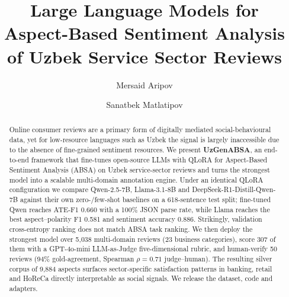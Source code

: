 \documentclass[runningheads]{llncs}
\begin{document}
\title{Large Language Models for Aspect-Based Sentiment Analysis of Uzbek Service Sector Reviews}


\author{Mersaid Aripov \and
Sanatbek Matlatipov}



\maketitle

\begin{abstract}
Online consumer reviews are a primary form of digitally mediated
social-behavioural data, yet for low-resource languages such as Uzbek the
signal is largely inaccessible due to the absence of fine-grained sentiment
resources. We present \textbf{UzGenABSA}, an end-to-end framework that
fine-tunes open-source LLMs with QLoRA for Aspect-Based Sentiment Analysis
(ABSA) on Uzbek service-sector reviews and turns the strongest model into a
scalable multi-domain annotation engine. Under an identical QLoRA
configuration we compare Qwen-2.5-7B, Llama-3.1-8B and
DeepSeek-R1-Distill-Qwen-7B against their own zero-/few-shot baselines on a
618-sentence test split; fine-tuned Qwen reaches ATE-F1 0.660 with a 100\%
JSON parse rate, while Llama reaches the best aspect--polarity F1 0.581 and
sentiment accuracy 0.886. Strikingly, validation cross-entropy ranking does
not match ABSA task ranking. We then deploy the strongest model over 5{,}038
multi-domain reviews (23 business categories), score 307 of them with a
GPT-4o-mini LLM-as-Judge five-dimensional rubric, and human-verify 50
reviews (94\% gold-agreement, Spearman $\rho{=}0.71$ judge--human). The
resulting silver corpus of 9{,}884 aspects surfaces sector-specific
satisfaction patterns in banking, retail and HoReCa directly interpretable
as social signals. We release the dataset, code and adapters.

\end{abstract}
\end{document}
